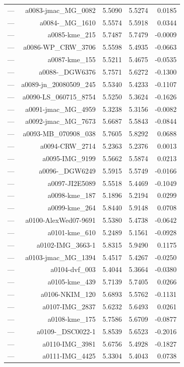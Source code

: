 \begin{table}[htbp]
\begin{tabular}{lrrrr}
— & a0083-jmac_MG_0082 & 5.5090 & 5.5274 & 0.0185 \\
— & a0084-_MG_1610 & 5.5574 & 5.5918 & 0.0344 \\
— & a0085-kme_215 & 5.7487 & 5.7479 & -0.0009 \\
— & a0086-WP_CRW_3706 & 5.5598 & 5.4935 & -0.0663 \\
— & a0087-kme_155 & 5.5211 & 5.4675 & -0.0535 \\
— & a0088-_DGW6376 & 5.7571 & 5.6272 & -0.1300 \\
— & a0089-jn_20080509_245 & 5.5340 & 5.4233 & -0.1107 \\
— & a0090-LS_060715_8754 & 5.5250 & 5.3624 & -0.1626 \\
— & a0091-jmac_MG_4959 & 5.3238 & 5.3156 & -0.0082 \\
— & a0092-jmac_MG_7673 & 5.6687 & 5.5843 & -0.0844 \\
— & a0093-MB_070908_038 & 5.7605 & 5.8292 & 0.0688 \\
— & a0094-CRW_2714 & 5.2363 & 5.2376 & 0.0013 \\
— & a0095-IMG_9199 & 5.5662 & 5.5874 & 0.0213 \\
— & a0096-_DGW6249 & 5.5915 & 5.5749 & -0.0166 \\
— & a0097-JI2E5089 & 5.5518 & 5.4469 & -0.1049 \\
— & a0098-kme_187 & 5.1896 & 5.2194 & 0.0299 \\
— & a0099-kme_264 & 5.8440 & 5.9148 & 0.0708 \\
— & a0100-AlexWed07-9691 & 5.5380 & 5.4738 & -0.0642 \\
— & a0101-kme_610 & 5.2489 & 5.1561 & -0.0928 \\
— & a0102-IMG_3663-1 & 5.8315 & 5.9490 & 0.1175 \\
— & a0103-jmac_MG_1394 & 5.4517 & 5.4267 & -0.0250 \\
— & a0104-dvf_003 & 5.4044 & 5.3664 & -0.0380 \\
— & a0105-kme_439 & 5.7139 & 5.7405 & 0.0266 \\
— & a0106-NKIM_120 & 5.6893 & 5.5762 & -0.1131 \\
— & a0107-IMG_2837 & 5.6232 & 5.6493 & 0.0261 \\
— & a0108-kme_175 & 5.7586 & 5.6709 & -0.0877 \\
— & a0109-_DSC0022-1 & 5.8539 & 5.6523 & -0.2016 \\
— & a0110-IMG_3981 & 5.6756 & 5.4928 & -0.1827 \\
— & a0111-IMG_4425 & 5.3304 & 5.4043 & 0.0738 \\

\end{tabular}
\end{table}
